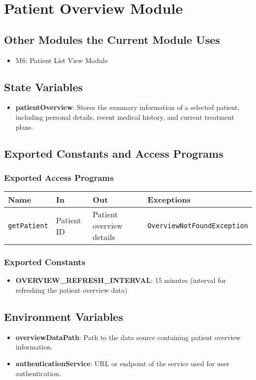 \documentclass[12pt, titlepage]{article}
\begin{document}
\section{Patient Overview Module}

\subsection{Other Modules the Current Module Uses}
\begin{itemize}
  \item M6: Patient List View Module
\end{itemize}

\subsection{State Variables}
\begin{itemize}
\item \textbf{patientOverview}: Stores the summary information of a selected patient, including personal details, recent medical history, and current treatment plans.
\end{itemize}

\subsection{Exported Constants and Access Programs}
\subsubsection{Exported Access Programs}
\begin{tabular}{|l|l|l|l|}
    \hline
    \textbf{Name} & \textbf{In} & \textbf{Out} & \textbf{Exceptions} \\
    \hline 
    \texttt{getPatient} & Patient ID & Patient overview details & \texttt{OverviewNotFoundException} \\
    \hline
\end{tabular}

\subsubsection{Exported Constants}
\begin{itemize}
\item \textbf{OVERVIEW\_REFRESH\_INTERVAL}: 15 minutes (interval for refreshing the patient overview data)
\end{itemize}

\subsection{Environment Variables}
\begin{itemize}
\item \textbf{overviewDataPath}: Path to the data source containing patient overview information.
\item \textbf{authenticationService}: URL or endpoint of the service used for user authentication.
\end{itemize}
\end{document}
